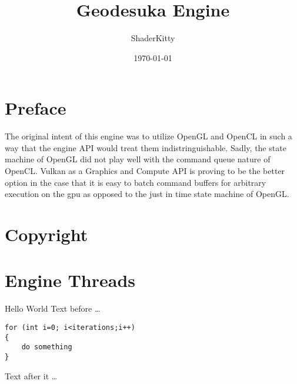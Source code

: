 \documentclass{book}
\title{Geodesuka Engine}
\author{ShaderKitty}
\date{\today}
\begin{document}
\maketitle

\tableofcontents

\frontmatter
\chapter{Preface}
The original intent of this engine was to utilize OpenGL and OpenCL in such a way that the engine API would treat them indistringuishable. Sadly, the state machine of OpenGL did not play well with the command queue nature of OpenCL. Vulkan as a Graphics and Compute API is proving to be the better option in the case that it is easy to batch command buffers for arbitrary execution on the gpu as opposed to the just in time state machine of OpenGL.
\mainmatter
\chapter{Copyright}

\chapter{Engine Threads}

Hello World
Text before \dots
\begin{lstlisting}
for (int i=0; i<iterations;i++)
{
	do something
}
\end{lstlisting}
Text after it \dots
\end{document}

